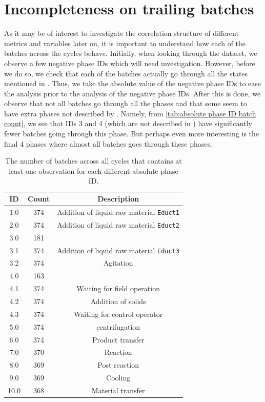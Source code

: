 \documentclass[../Thesis.tex]{subfiles}
\begin{document}
\section{Incompleteness on trailing batches}
As it may be of interest to investigate the correlation structure of different metrics and variables later on, it is important to understand how each of the batches across the cycles behave. Initially, when looking through the dataset, we observe a few negative phase IDs which will need investigation. However, before we do so, we check that each of the batches actually go through all the states mentioned in \cite{benchmark-model-to-generate-batch-process-data}. Thus, we take the absolute value of the negative phase IDs to ease the analysis prior to the analysis of the negative phase IDs. After this is done, we observe that not all batches go through all the phases and that some seem to have extra phases not described by \cite{benchmark-model-to-generate-batch-process-data}. Namely, from \autoref{tab:absolute phase ID batch count}, we see that IDs 3 and 4 (which are not described in \cite{benchmark-model-to-generate-batch-process-data}) have significantly fewer batches going through this phase. But perhaps even more interesting is the final 4 phases where almost all batches goes through these phases.

\begin{table}[h]
    \centering
\begin{tabular}{c|c|c}
        ID   & Count & Description \\\hline
        1.0  & 374 & Addition of liquid raw material \texttt{Educt1} \\
        2.0  & 374 & Addition of liquid raw material \texttt{Educt2} \\
        3.0  & 181 &  \\
        3.1  & 374 & Addition of liquid raw material \texttt{Educt3} \\
        3.2  & 374 & Agitation \\
        4.0  & 163 &  \\
        4.1  & 374 & Waiting for field operation \\
        4.2  & 374 & Addition of solids \\
        4.3  & 374 & Waiting for control operator \\
        5.0  & 374 & centrifugation \\
        6.0  & 374 & Product transfer \\
        7.0  & 370 & Reaction \\
        8.0  & 369 & Post reaction \\
        9.0  & 369 & Cooling \\
        10.0 & 368 & Material transfer
    \end{tabular}
    \caption{The number of batches across all cycles that contains at least one observation for each different absolute phase ID.}
    \label{tab:absolute phase ID batch count}
\end{table}
\end{document}

